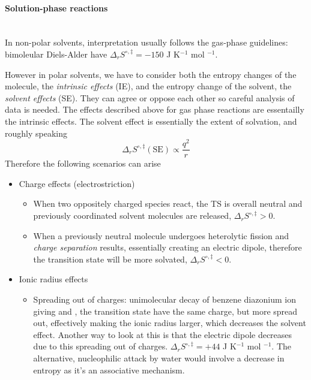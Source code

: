 \paragraph{Solution-phase reactions} ~\\
In non-polar solvents, interpretation usually follows the gas-phase guidelines: bimoleular Diels-Alder have $\Delta_rS^{\circ,\ddag}=-150$ J K$^{-1}$ mol $^{-1}$.\par
However in polar solvents, we have to consider both the entropy changes of the molecule, \ie the \emph{intrinsic effects} (IE), and the entropy change of the solvent, \ie the \emph{solvent effects} (SE). They can agree or oppose each other so careful analysis of data is needed. The effects described above for gas phase reactions are essentailly the intrinsic effects. The solvent effect is essentially the extent of solvation, and roughly speaking
\begin{equation}
  \Delta_rS^{\circ,\ddag}(\text{SE})\propto\frac{q^2}{r}
\end{equation}
Therefore the following scenarios can arise
\begin{itemize}
  \item Charge effects (electrostriction)
  \begin{itemize}
    \item When two oppositely charged species react, the TS is overall neutral and previously coordinated solvent molecules are released, $\Delta_rS^{\circ,\ddag}>0$.
    \item When a previously neutral molecule undergoes heterolytic fission and \emph{charge separation} results, essentially creating an electric dipole, therefore the transition state will be more solvated, $\Delta_rS^{\circ,\ddag}<0$.
  \end{itemize}
  \item Ionic radius effects
  \begin{itemize}
    \item Spreading out of charges: unimolecular decay of benzene diazonium ion giving  and \ch{[C6H6]+}, the transition state have the same charge, but more spread out, effectively making the ionic radius larger, which decreases the solvent effect. Another way to look at this is that the electric dipole decreases due to this spreading out of charges. $\Delta_rS^{\circ,\ddag}=+44$ J K$^{-1}$ mol $^{-1}$. The alternative, nucleophilic attack by water would involve a decrease in entropy as it's an associative mechanism.
  \end{itemize}
\end{itemize}
